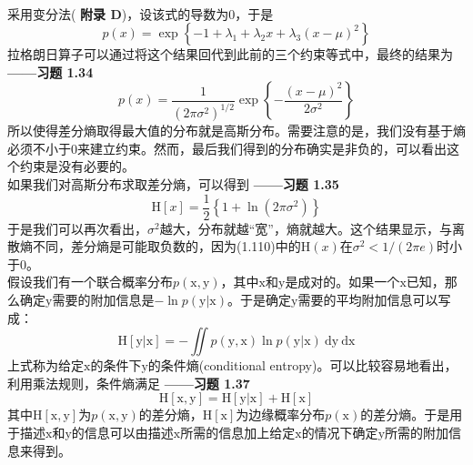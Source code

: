 \documentclass[b5paper]{book}
\numberwithin{equation}{chapter}
\begin{document}
{\begin{equation*}
\begin{split}
	\end{split}
	\end{equation*}
	采用变分法(\color{red} \textbf{附录 D}\color{black})，设该式的导数为0，于是
	\begin{equation}
		p(x)=\exp\left\{-1+\lambda_1+\lambda_2 x + \lambda_3(x-\mu)^2\right\}
	\end{equation}
	拉格朗日算子可以通过将这个结果回代到此前的三个约束等式中，最终的结果为\color{red} \textbf{——习题 1.34} \color{black}
	\begin{equation}
		p(x)=\frac{1}{(2\pi\sigma^2)^{1/2}}\exp\left\{-\frac{(x-\mu)^2}{2\sigma^2}\right\}
	\end{equation}
	所以使得差分熵取得最大值的分布就是高斯分布。需要注意的是，我们没有基于熵必须不小于0来建立约束。然而，最后我们得到的分布确实是非负的，可以看出这个约束是没有必要的。\\
	\indent 如果我们对高斯分布求取差分熵，可以得到\color{red} \textbf{——习题 1.35} \color{black}
	\begin{equation}
		\mathrm{H}[x]=\frac{1}{2}\left\{1+\ln(2\pi\sigma^2)\right\}
	\end{equation}
	于是我们可以再次看出，$\sigma^2$越大，分布就越“宽”，熵就越大。这个结果显示，与离散熵不同，差分熵是可能取负数的，因为(1.110)中的$\mathrm{H}(x)$在$\sigma^2<1/(2\pi e)$时小于0。\\
	\indent 假设我们有一个联合概率分布$p(\boldsymbol{\mathrm{x}},\boldsymbol{\mathrm{y}})$，其中$\boldsymbol{\mathrm{x}}$和$\boldsymbol{\mathrm{y}}$是成对的。如果一个$\boldsymbol{\mathrm{x}}$已知，那么确定$\boldsymbol{\mathrm{y}}$需要的附加信息是$-\ln p(\boldsymbol{\mathrm{y}}|\boldsymbol{\mathrm{x}})$。于是确定$\boldsymbol{\mathrm{y}}$需要的平均附加信息可以写成：
	\begin{equation}
		\mathrm{H}[\boldsymbol{\mathrm{y}}|\boldsymbol{\mathrm{x}}]=-\iint p(\boldsymbol{\mathrm{y}},\boldsymbol{\mathrm{x}})\ln p(\boldsymbol{\mathrm{y}}|\boldsymbol{\mathrm{x}})\ \mathrm{d}\boldsymbol{\mathrm{y}}\ \mathrm{d}\boldsymbol{\mathrm{x}}
	\end{equation}
	上式称为给定$\boldsymbol{\mathrm{x}}$的条件下$\boldsymbol{\mathrm{y}}$的条件熵(conditional entropy)。可以比较容易地看出，利用乘法规则，条件熵满足\color{red} \textbf{——习题 1.37} \color{black}
	\begin{equation}
		\mathrm{H}[\boldsymbol{\mathrm{x}},\boldsymbol{\mathrm{y}}] = \mathrm{H}[\boldsymbol{\mathrm{y}}|\boldsymbol{\mathrm{x}}] + \mathrm{H}[\boldsymbol{\mathrm{x}}]
	\end{equation}
	其中$\mathrm{H}[\boldsymbol{\mathrm{x}},\boldsymbol{\mathrm{y}}]$为$p(\boldsymbol{\mathrm{x}},\boldsymbol{\mathrm{y}})$的差分熵，$\mathrm{H}[\boldsymbol{\mathrm{x}}]$为边缘概率分布$p(\boldsymbol{\mathrm{x}})$的差分熵。于是用于描述$\boldsymbol{\mathrm{x}}$和$\boldsymbol{\mathrm{y}}$的信息可以由描述$\boldsymbol{\mathrm{x}}$所需的信息加上给定$\boldsymbol{\mathrm{x}}$的情况下确定$\boldsymbol{\mathrm{y}}$所需的附加信息来得到。}
\end{document}
